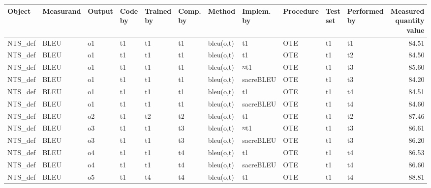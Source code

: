 \begin{tabular}{lllllllllllr}
\toprule
      Object & Measurand & Output & Code by & Trained by & Comp. by &       Method & Implem. by & Procedure & Test set & Performed by & Measured quantity value \\
\midrule
     NTS\_def &      BLEU &     o1 &      t1 &         t1 &       t1 &   bleu(o,t)  &         t1 &      OTE  &       t1 &           t1 &                   84.51 \\
     NTS\_def &      BLEU &     o1 &      t1 &         t1 &       t1 &   bleu(o,t)  &         t1 &      OTE  &       t1 &           t2 &                   84.50 \\
     NTS\_def &      BLEU &     o1 &      t1 &         t1 &       t1 &   bleu(o,t)  &        ≈t1 &      OTE  &       t1 &           t3 &                   85.60 \\
     NTS\_def &      BLEU &     o1 &      t1 &         t1 &       t1 &   bleu(o,t)  &  sacreBLEU &      OTE  &       t1 &           t3 &                   84.20 \\
     NTS\_def &      BLEU &     o1 &      t1 &         t1 &       t1 &    bleu(o,t) &         t1 &       OTE &       t1 &           t4 &                   84.51 \\
     NTS\_def &      BLEU &     o1 &      t1 &         t1 &       t1 &    bleu(o,t) &  sacreBLEU &       OTE &       t1 &           t4 &                   84.60 \\
     NTS\_def &      BLEU &     o2 &      t1 &         t2 &       t2 &   bleu(o,t)  &         t1 &      OTE  &       t1 &           t2 &                   87.46 \\
     NTS\_def &      BLEU &     o3 &      t1 &         t1 &       t3 &   bleu(o,t)  &        ≈t1 &      OTE  &       t1 &           t3 &                   86.61 \\
     NTS\_def &      BLEU &     o3 &      t1 &         t1 &       t3 &   bleu(o,t)  &  sacreBLEU &      OTE  &       t1 &           t3 &                   86.20 \\
     NTS\_def &      BLEU &     o4 &      t1 &         t1 &       t4 &    bleu(o,t) &         t1 &       OTE &       t1 &           t4 &                   86.53 \\
     NTS\_def &      BLEU &     o4 &      t1 &         t1 &       t4 &    bleu(o,t) &  sacreBLEU &       OTE &       t1 &           t4 &                   86.60 \\
     NTS\_def &      BLEU &     o5 &      t1 &         t4 &       t4 &    bleu(o,t) &         t1 &       OTE &       t1 &           t4 &                   88.81 \\

\end{tabular}
